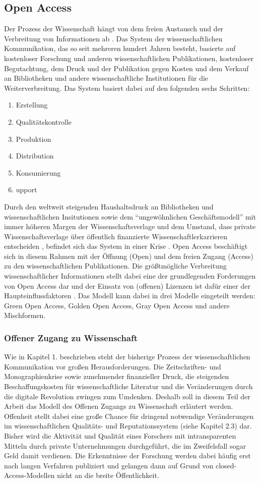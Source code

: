 \subsection{Open Access} 
Der Prozess der Wissenschaft hängt von dem freien Austausch und der Verbreitung von Informationen ab . Das System der wissenschaftlichen Kommunikation, das so seit mehreren hundert Jahren besteht, basierte auf kostenloser Forschung und anderen wissenschaftlichen Publikationen, kostenloser Begutachtung, dem Druck und der Publikation gegen Kosten und dem Verkauf an Bibliotheken und andere wissenschaftliche Institutionen für die Weiterverbreitung. Das System basiert dabei auf den folgenden sechs Schritten:
\begin{enumerate}
\item Erstellung
\item Qualitätskontrolle
\item Produktion
\item Distribution
\item Konsumierung
\item upport
\end{enumerate}
Durch den weltweit steigenden Haushaltsdruck an Bibliotheken und wissenschaftlichen Insitutionen sowie dem “ungewöhnlichen Geschäftsmodell”  mit immer höheren Margen der Wissenschaftsverlage und dem Umstand, dass private Wissenschaftsverlage über öffentlich finanzierte Wissenschaftlerkarrieren entscheiden , befindet sich das System in einer Krise . Open Access beschäftigt sich in diesem Rahmen mit der Öffnung (Open) und dem freien Zugang (Access) zu den wissenschaftlichen Publikationen. Die größtmögliche Verbreitung wissenschaftlicher Informationen stellt dabei eine der grundlegenden Forderungen von Open Access dar  und der Einsatz von (offenen) Lizenzen ist dafür einer der Haupteinflussfaktoren . Das Modell kann dabei in drei Modelle eingeteilt werden: Green Open Access, Golden Open Access, Gray Open Access und andere Mischformen.
\subsubsection{Offener Zugang zu Wissenschaft}
Wie in Kapitel 1. beschrieben steht der bisherige Prozess der wissenschaftlichen Kommunikation vor großen Herausforderungen. Die Zeitschriften- und Monographienkrise sowie zunehmender finanzieller Druck, die steigenden Beschaffungskosten für wissenschaftliche Literatur  und die Veränderungen durch die digitale Revolution zwingen zum Umdenken. Deshalb soll in diesem Teil der Arbeit das Modell des Offenen Zugangs zu Wissenschaft erläutert werden.
Offenheit stellt dabei eine große Chance für dringend notwendige Veränderungen im wissenschaftlichen Qualitäts- und Reputationssystem (siehe Kapitel 2.3) dar. Bisher wird die Aktivität und Qualität eines Forschers mit intransparenten Mitteln durch private Unternehmungen durchgeführt, die im Zweifelsfall sogar Geld damit verdienen. Die Erkenntnisse der Forschung werden dabei häufig erst nach langen Verfahren publiziert und gelangen dann auf Grund von closed-Access-Modellen nicht an die breite Öffentlichkeit.
